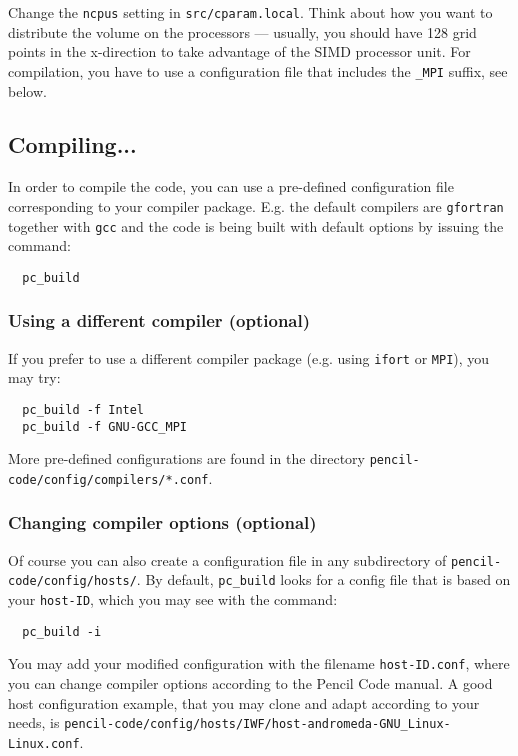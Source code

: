 \documentclass[a4paper,12pt]{article}
\begin{document}
Change the \verb|ncpus| setting in \verb|src/cparam.local|.
Think about how you want to distribute the volume on the processors --- usually, you should have 128 grid points in the x-direction to take advantage of the SIMD processor unit.
For compilation, you have to use a configuration file that includes the \verb|_MPI| suffix, see below.

\subsection{Compiling...}

In order to compile the code, you can use a pre-defined configuration file corresponding to your compiler package.
E.g. the default compilers are \verb|gfortran| together with \verb|gcc| and the code is being built with default options by issuing the command:

\begin{verbatim}
  pc_build
\end{verbatim}

\subsubsection{Using a different compiler (optional)}

If you prefer to use a different compiler package (e.g. using \verb|ifort| or \verb|MPI|), you may try:

\begin{verbatim}
  pc_build -f Intel
  pc_build -f GNU-GCC_MPI
\end{verbatim}

More pre-defined configurations are found in the directory \verb|pencil-code/config/compilers/*.conf|.

\subsubsection{Changing compiler options (optional)}

Of course you can also create a configuration file in any subdirectory of \verb|pencil-code/config/hosts/|.
By default, \verb|pc_build| looks for a config file that is based on your \verb|host-ID|, which you may see with the command:
\begin{verbatim}
  pc_build -i
\end{verbatim}
You may add your modified configuration with the filename \verb|host-ID.conf|, where you can change compiler options according to the Pencil Code manual.
A good host configuration example, that you may clone and adapt according to your needs, is \verb|pencil-code/config/hosts/IWF/host-andromeda-GNU_Linux-Linux.conf|.
\end{document}
